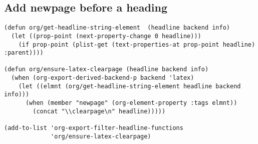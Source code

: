 \documentclass[letterpaper, 11pt]{article}
\begin{document}
\subsection{Add newpage before a heading}
\label{sec:orgdc04e92}

\begin{verbatim}
(defun org/get-headline-string-element  (headline backend info)
  (let ((prop-point (next-property-change 0 headline)))
    (if prop-point (plist-get (text-properties-at prop-point headline) :parent))))

(defun org/ensure-latex-clearpage (headline backend info)
  (when (org-export-derived-backend-p backend 'latex)
    (let ((elmnt (org/get-headline-string-element headline backend info)))
      (when (member "newpage" (org-element-property :tags elmnt))
        (concat "\\clearpage\n" headline)))))

(add-to-list 'org-export-filter-headline-functions
             'org/ensure-latex-clearpage)

\end{verbatim}
\end{document}
